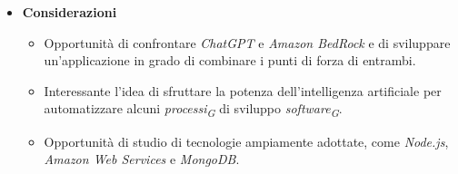 \documentclass{article}
\begin{document}
\begin{itemize}
    \item[] \textbf{Considerazioni}
    \begin{itemize}
        \item Opportunità di confrontare \textit{ChatGPT} e \textit{Amazon BedRock} e di sviluppare un'applicazione in grado di combinare i punti di forza di entrambi.
        \item Interessante l'idea di sfruttare la potenza dell'intelligenza artificiale per automatizzare alcuni \textit{processi}\textsubscript{\textit{G}} di sviluppo \textit{software}\textsubscript{\textit{G}}.
        \item Opportunità di studio di tecnologie ampiamente adottate, come \textit{Node.js}, \textit{Amazon Web Services} e \textit{MongoDB}.
    \end{itemize} 

\end{itemize}
\pagebreak

\end{document}
